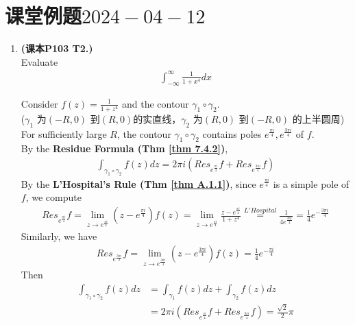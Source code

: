 \section{课堂例题$2024-04-12$}
	\begin{enumerate}
		\item \textbf{(课本P103 T2.)}\\
		Evaluate 
		\begin{align}
			\int_{-\infty}^{\infty}{\frac{1}{1 + x^4} dx}
		\end{align}
	
		\vspace{2em}
		\begin{solution}
			Consider $f(z) = \frac{1}{1 + z^4}$ and the contour $\gamma_1 \circ \gamma_2$. \\
			\hspace*{5em}($\gamma_1$ 为$(-R, 0)$ 到$(R , 0)$的实直线，$\gamma_2$ 为$(R,0)$ 到$(-R,0)$ 的上半圆周)\\
			For sufficiently large $R$, the contour $\gamma_1 \circ \gamma_2$ contains poles $e^{\frac{\pi i}{4}} , e^{\frac{3\pi i}{4}}$ of $f$. \\
			By the \textbf{Residue Formula (Thm \ref{thm 7.4.2})},
			\begin{align}
				\int_{\gamma_1 \circ \gamma_2}{f(z) dz} = 2 \pi i \left( Res_{e^{\frac{\pi i}{4}}}f + Res_{e^{\frac{3\pi i}{4}}}f \right)
			\end{align}
			By the \textbf{L'Hospital's Rule (Thm \ref{thm A.1.1})}, since $e^{\frac{\pi i}{4}}$ is a simple pole of $f$, we compute
			\begin{align}
				Res_{e^{\frac{\pi i}{4}}}f 
				= \lim_{z \to e^{\frac{\pi i}{4}}}{(z - e^{\frac{\pi i}{4}}) f(z)}
				= \lim_{z \to e^{\frac{\pi i}{4}}}{\frac{z - e^{\frac{\pi i}{4}}}{1 + z^4}}
				\overset{L'Hospital}{=} \frac{1}{4 e^{\frac{3\pi i}{4}}} 
				= \frac{1}{4} e^{-\frac{3 \pi i}{4}}
			\end{align}
			Similarly, we have
			\begin{align}
				Res_{e^{\frac{3 \pi i}{4}}}f = \lim_{z \to e^{\frac{3 \pi i}{4}}}{(z - e^{\frac{3 \pi i}{4}}) f(z)} = \frac{1}{4} e^{-\frac{\pi i}{4}}
			\end{align}
			Then
			\begin{align}
				\int_{\gamma_1 \circ \gamma_2}{f(z) dz} 
				&= \int_{\gamma_1}{f(z) dz} + \int_{\gamma_2}{f(z) dz} \\ 
				&= 2 \pi i \left( Res_{e^{\frac{\pi i}{4}}}f + Res_{e^{\frac{3\pi i}{4}}}f \right) 
				= \frac{\sqrt{2}}{2}\pi 

\end{align}
\end{solution}
\end{enumerate}
